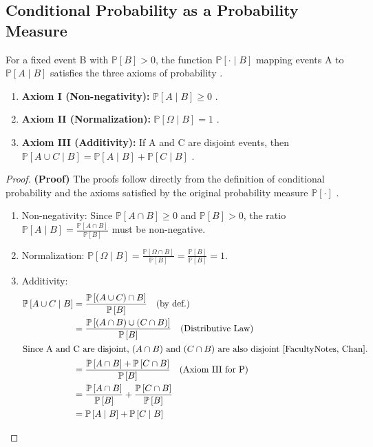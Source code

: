 \documentclass[12pt, a4paper]{article}
\theoremstyle{definition}
\theoremstyle{plain}
\newcommand{\Prob}[1]{\mathbb{P}\left[#1\right]} %
\newcommand{\condProb}[2]{\mathbb{P}\left[#1 \mid #2\right]} %
\newcommand{\intersect}{\cap} %
\newcommand{\union}{\cup}     %
\newcommand{\samplespace}{\Omega} %
\begin{document}
\subsection{Conditional Probability as a Probability Measure}
For a fixed event B with $\Prob{B}>0$, the function $\condProb{\cdot}{B}$ mapping events A to $\condProb{A}{B}$ satisfies the three axioms of probability \cite{FacultyNotes, Chan}.
\begin{enumerate}
    \item \textbf{Axiom I (Non-negativity):} $\condProb{A}{B} \ge 0$ \cite{FacultyNotes, Chan}.
    \item \textbf{Axiom II (Normalization):} $\condProb{\samplespace}{B} = 1$ \cite{FacultyNotes, Chan}.
    \item \textbf{Axiom III (Additivity):} If A and C are disjoint events, then $\condProb{A \union C}{B} = \condProb{A}{B} + \condProb{C}{B}$ \cite{FacultyNotes, Chan}.
\end{enumerate}
\begin{proof}
\textbf{(Proof)} The proofs follow directly from the definition of conditional probability and the axioms satisfied by the original probability measure $\Prob{\cdot}$ \cite{FacultyNotes, Chan}.
\begin{enumerate}
    \item Non-negativity: Since $\Prob{A \intersect B} \ge 0$ and $\Prob{B} > 0$, the ratio $\condProb{A}{B} = \frac{\Prob{A \intersect B}}{\Prob{B}}$ must be non-negative.
    \item Normalization: $\condProb{\samplespace}{B} = \frac{\Prob{\samplespace \intersect B}}{\Prob{B}} = \frac{\Prob{B}}{\Prob{B}} = 1$.
    \item Additivity:
    \begin{align*}
        \condProb{A \union C}{B} &= \frac{\Prob{(A \union C) \intersect B}}{\Prob{B}} \quad \text{(by def.)} \\
        &= \frac{\Prob{(A \intersect B) \union (C \intersect B)}}{\Prob{B}} \quad \text{(Distributive Law)} \\
        \intertext{Since A and C are disjoint, $(A \intersect B)$ and $(C \intersect B)$ are also disjoint \cite{FacultyNotes, Chan}.}
        &= \frac{\Prob{A \intersect B} + \Prob{C \intersect B}}{\Prob{B}} \quad \text{(Axiom III for P)} \\
        &= \frac{\Prob{A \intersect B}}{\Prob{B}} + \frac{\Prob{C \intersect B}}{\Prob{B}} \\
        &= \condProb{A}{B} + \condProb{C}{B}
    \end{align*}
\end{enumerate}
\end{proof}
\end{document}
